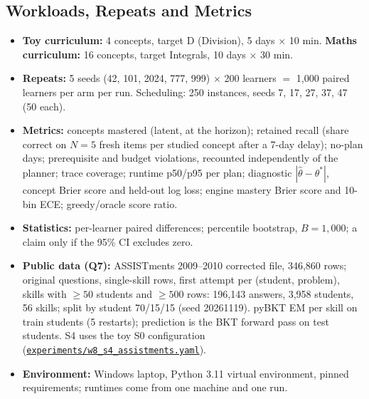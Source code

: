 \documentclass[english]{sintr}
\newcommand{\repourl}{https://github.com/Bhuvan-56/adaptive-learning-path-planner-DAT}
\newcommand{\shax}{cs5903-final-2026}
\DeclareRobustCommand{\rfx}[1]{\href{\repourl/blob/\shax/#1}{\nolinkurl{#1}}}
\begin{document}
\subsection{Workloads, Repeats and Metrics}
\begin{itemize}
    \item \textbf{Toy curriculum:} 4 concepts, target D (Division), 5 days $\times$ 10 min. \textbf{Maths curriculum:} 16 concepts, target Integrals, 10 days $\times$ 30 min.
    \item \textbf{Repeats:} 5 seeds (42, 101, 2024, 777, 999) $\times$ 200 learners $=$ 1,000 paired learners per arm per run. Scheduling: 250 instances, seeds 7, 17, 27, 37, 47 (50 each).
    \item \textbf{Metrics:} concepts mastered (latent, at the horizon); retained recall (share correct on $N=5$ fresh items per studied concept after a 7-day delay); no-plan days; prerequisite and budget violations, recounted independently of the planner; trace coverage; runtime p50/p95 per plan; diagnostic $|\hat\theta-\theta^*|$, concept Brier score and held-out log loss; engine mastery Brier score and 10-bin ECE; greedy/oracle score ratio.
    \item \textbf{Statistics:} per-learner paired differences; percentile bootstrap, $B = 1{,}000$; a claim only if the 95\% CI excludes zero.
    \item \textbf{Public data (Q7):} ASSISTments 2009--2010 corrected file, 346,860 rows; original questions, single-skill rows, first attempt per (student, problem), skills with $\geq 50$ students and $\geq 500$ rows: 196,143 answers, 3,958 students, 56 skills; split by student 70/15/15 (seed 20261119). pyBKT EM per skill on train students (5 restarts); prediction is the BKT forward pass on test students. S4 uses the toy S0 configuration (\rfx{experiments/w8_s4_assistments.yaml}).
    \item \textbf{Environment:} Windows laptop, Python 3.11 virtual environment, pinned requirements; runtimes come from one machine and one run.
\end{itemize}
\end{document}
